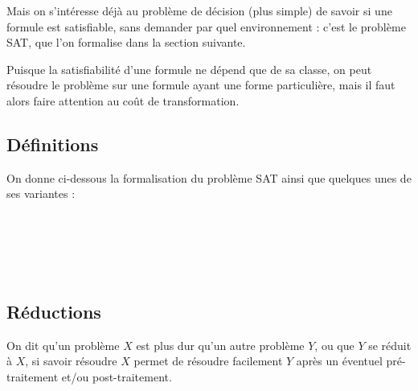 	Mais on s'intéresse déjà au problème de décision (plus simple) de savoir si une formule est satisfiable, sans demander par quel environnement : c'est le problème \textsf{SAT}, que l'on formalise dans la section suivante.
	
	\begin{Remarque}
		Puisque la satisfiabilité d'une formule ne dépend que de sa classe, on peut résoudre le problème sur une formule ayant une forme particulière, mais il faut alors faire attention au coût de transformation.
	\end{Remarque}
	
	
	\subsection{Définitions}
		
		On donne ci-dessous la formalisation du problème \textsf{{SAT}} ainsi que quelques unes de ses variantes :
			\begin{center}
				 \\[3mm]				 \\[3mm]	
				 \\[3mm]	
				 \\[3mm]	
			\end{center}
		
	\subsection{Réductions}
	
		\begin{Rappel}
			On dit qu'un problème \(X\) est plus dur qu'un autre problème \(Y\), ou que \(Y\) se réduit à \(X\), si savoir résoudre \(X\) permet de résoudre facilement \(Y\) après un éventuel pré-traitement et/ou post-traitement.
		\end{Rappel}
		
